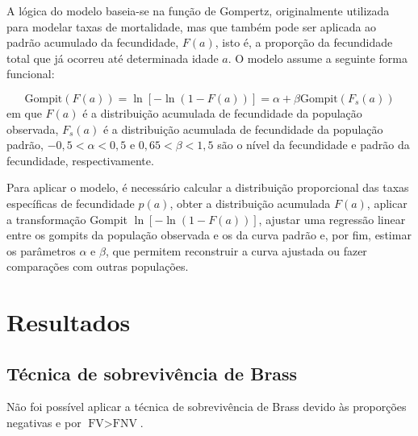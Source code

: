 \documentclass[
  12pt,
  a4paper,
]{scrreprt}
\begin{document}
\vspace{12pt}

A lógica do modelo baseia-se na função de Gompertz, originalmente
utilizada para modelar taxas de mortalidade, mas que também pode ser
aplicada ao padrão acumulado da fecundidade, \(F\left(a\right)\), isto
é, a proporção da fecundidade total que já ocorreu até determinada idade
\(a\). O modelo assume a seguinte forma funcional:

\[
\text{Gompit}\left(F\left(a\right)\right) = \ln\left[-\ln\left(1-F\left(a\right)\right)\right] = \alpha + \beta\text{Gompit}\left(F_{s}\left(a\right)\right)
\] em que \(F\left(a\right)\) é a distribuição acumulada de fecundidade
da população observada, \(F_{s}\left(a\right)\) é a distribuição
acumulada de fecundidade da população padrão, \(-0,5< \alpha < 0,5\) e
\(0,65 < \beta < 1,5\) são o nível da fecundidade e padrão da
fecundidade, respectivamente.

\vspace{12pt}

Para aplicar o modelo, é necessário calcular a distribuição proporcional
das taxas específicas de fecundidade \(p\left(a\right)\), obter a
distribuição acumulada \(F\left(a\right)\), aplicar a transformação
Gompit \(\ln\left[-\ln\left(1 - F\left(a\right)\right)\right]\), ajustar
uma regressão linear entre os gompits da população observada e os da
curva padrão e, por fim, estimar os parâmetros \(\alpha\) e \(\beta\),
que permitem reconstruir a curva ajustada ou fazer comparações com
outras populações.

\chapter{Resultados}\label{resultados}

\section{Técnica de sobrevivência de
Brass}\label{tuxe9cnica-de-sobrevivuxeancia-de-brass-1}

Não foi possível aplicar a técnica de sobrevivência de Brass devido às
proporções negativas e por \(\text{FV} > \text{FNV}\).
\end{document}
